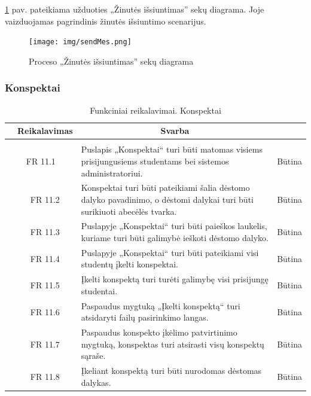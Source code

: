 \documentclass{VUMIFPSkursinis}
\begin{document}
\ref{fig:sendmessage} pav. pateikiama užduoties „Žinutės išsiuntimas” sekų diagrama. Joje vaizduojamas pagrindinis žinutės išsiuntimo scenarijus.
\begin{figure}[H]
	\centering
	\texttt{[image: img/sendMes.png]}
	\caption{Proceso „Žinutės išsiuntimas” sekų diagrama}
	\label{fig:sendmessage}
\end{figure}

\subsubsection{Konspektai}

\begin{table}[H]
	\caption{Funkciniai reikalavimai. Konspektai}
	\begin{tabular}{|p{1cm}|p{1cm}|p{}|p{}|}
		\hline 
		\rowcolor{gray!50}
		\multicolumn{2}{|c|}{{\bfseries Kodas}}&
		\multicolumn{1}{c|}{{\bfseries Reikalavimas}}&
		\multicolumn{1}{c|}{{\bfseries Svarba}}\\
		\hline
		\rowcolor{lightgray}
		\multicolumn{4}{|c|}{Konspektai}\\		
		
		\hline
		\multicolumn{2}{|c|}{FR 11.1}&
		{Puslapis „Konspektai“ turi būti matomas visiems prisijungusiems studentams bei sistemos administratoriui.
		}&		
		\multicolumn{1}{c|}{Būtina}\\
		\hline
		\multicolumn{1}{|c}{}&
		\multicolumn{1}{c|}{FR 11.2}&
		{Konspektai turi būti pateikiami šalia dėstomo dalyko pavadinimo, o dėstomi dalykai turi būti surikiuoti abecėlės tvarka.
		}&		
		\multicolumn{1}{c|}{Būtina}\\
		\hline
		\multicolumn{1}{|c}{}&
		\multicolumn{1}{c|}{FR 11.3}&
		{Puslapyje „Konspektai“ turi būti paieškos laukelis, kuriame turi būti galimybė ieškoti dėstomo dalyko.
		}&
		\multicolumn{1}{c|}{Būtina}\\	
		\hline		
		\multicolumn{1}{|c}{}&
		\multicolumn{1}{c|}{FR 11.4}&
		{Puslapyje „Konspektai“ turi būti pateikiami visi studentų įkelti konspektai.
		}&
		\multicolumn{1}{c|}{Būtina}\\									
		\hline
		\multicolumn{1}{|c}{}&
		\multicolumn{1}{c|}{FR 11.5}&
		{Įkelti konspektą turi turėti galimybę visi prisijungę studentai.
		}&
		\multicolumn{1}{c|}{Būtina}\\	
		\hline	
		\multicolumn{1}{|c}{}&
		\multicolumn{1}{c|}{FR 11.6}&
		{Paspaudus mygtuką „Įkelti konspektą“ turi atsidaryti failų pasirinkimo langas.
		}&
		\multicolumn{1}{c|}{Būtina}\\	
		\hline		
		\multicolumn{1}{|c}{}&
		\multicolumn{1}{c|}{FR 11.7}&
		{Paspaudus konspekto įkėlimo patvirtinimo mygtuką, konspektas turi atsirasti visų konspektų sąraše.
		}&
		\multicolumn{1}{c|}{Būtina}\\									
		\hline
		\multicolumn{1}{|c}{}&
		\multicolumn{1}{c|}{FR 11.8}&
		{Įkeliant konspektą turi būti nurodomas dėstomas dalykas.
		}&
		\multicolumn{1}{c|}{Būtina}\\	
		\hline		
	\end{tabular}		
\end{table}
\end{document}

